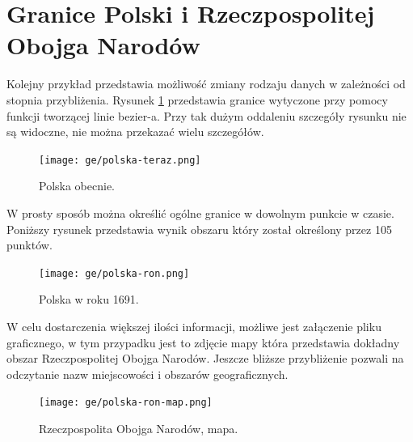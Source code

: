 \section{Granice Polski i Rzeczpospolitej Obojga Narodów}
\label{sec:usahistory}

Kolejny przykład przedstawia możliwość zmiany rodzaju danych w zależności od stopnia przybliżenia. Rysunek \ref{fig:po1} przedstawia granice wytyczone przy pomocy funkcji tworzącej linie bezier-a. Przy tak dużym oddaleniu szczegóły rysunku nie są widoczne, nie można przekazać wielu szczegółów.

\begin{figure}[H]
  \centering
    \texttt{[image: ge/polska-teraz.png]}
  \caption{Polska obecnie.}
  \label{fig:po1}
\end{figure}

W prosty sposób można określić ogólne granice w dowolnym punkcie w czasie. Poniższy rysunek przedstawia wynik obszaru który został określony przez 105 punktów.

\begin{figure}[H]
  \centering
    \texttt{[image: ge/polska-ron.png]}
  \caption{Polska w roku 1691.}
  \label{fig:po2}
\end{figure}

W celu dostarczenia większej ilości informacji, możliwe jest załączenie pliku graficznego, w tym przypadku jest to zdjęcie mapy która przedstawia dokładny obszar Rzeczpospolitej Obojga Narodów. Jeszcze bliższe przybliżenie pozwali na odczytanie nazw miejscowości i obszarów geograficznych.

\begin{figure}[H]
  \centering
    \texttt{[image: ge/polska-ron-map.png]}
  \caption{Rzeczpospolita Obojga Narodów, mapa.}
  \label{fig:po3}
\end{figure}
